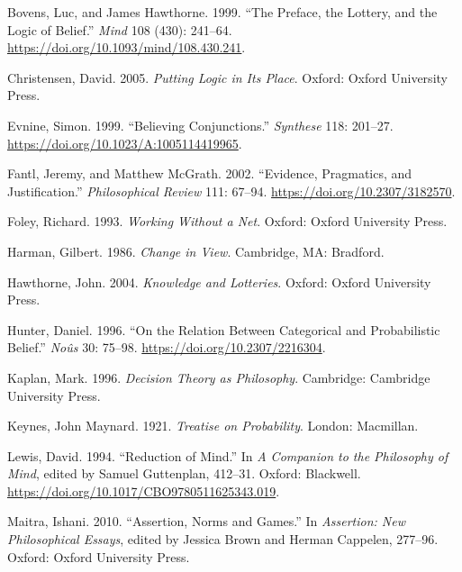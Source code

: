 \documentclass[
  11pt,
  letterpaper,
  DIV=11,
  numbers=noendperiod,
  oneside]{scrartcl}
\newlength{\cslhangindent}
\newenvironment{CSLReferences}[2] %
 {\begin{list}{}{%
  \setlength{\itemindent}{0pt}
  \setlength{\leftmargin}{0pt}
  \setlength{\parsep}{0pt}
  \ifodd #1
   \setlength{\leftmargin}{\cslhangindent}
   \setlength{\itemindent}{-1\cslhangindent}
  \fi
  \setlength{\itemsep}{#2\baselineskip}}}
 {\end{list}}
\begin{document}
\label{refs}
\begin{CSLReferences}{1}{0}
Bovens, Luc, and James Hawthorne. 1999. {``The Preface, the Lottery, and
the Logic of Belief.''} \emph{Mind} 108 (430): 241--64.
\url{https://doi.org/10.1093/mind/108.430.241}.

Christensen, David. 2005. \emph{Putting Logic in Its Place}. Oxford:
Oxford University Press.

Evnine, Simon. 1999. {``Believing Conjunctions.''} \emph{Synthese} 118:
201--27. \url{https://doi.org/10.1023/A:1005114419965}.

Fantl, Jeremy, and Matthew McGrath. 2002. {``Evidence, Pragmatics, and
Justification.''} \emph{Philosophical Review} 111: 67--94.
\url{https://doi.org/10.2307/3182570}.

Foley, Richard. 1993. \emph{Working Without a Net}. Oxford: Oxford
University Press.

Harman, Gilbert. 1986. \emph{Change in View}. Cambridge, MA: Bradford.

Hawthorne, John. 2004. \emph{Knowledge and Lotteries}. Oxford: Oxford
University Press.

Hunter, Daniel. 1996. {``On the Relation Between Categorical and
Probabilistic Belief.''} \emph{No{û}s} 30: 75--98.
\url{https://doi.org/10.2307/2216304}.

Kaplan, Mark. 1996. \emph{Decision Theory as Philosophy}. Cambridge:
Cambridge University Press.

Keynes, John Maynard. 1921. \emph{Treatise on Probability}. London:
Macmillan.

Lewis, David. 1994. {``Reduction of Mind.''} In \emph{A Companion to the
Philosophy of Mind}, edited by Samuel Guttenplan, 412--31. Oxford:
Blackwell. \url{https://doi.org/10.1017/CBO9780511625343.019}.

Maitra, Ishani. 2010. {``Assertion, Norms and Games.''} In
\emph{Assertion: New Philosophical Essays}, edited by Jessica Brown and
Herman Cappelen, 277--96. Oxford: Oxford University Press.


\end{CSLReferences}
\end{document}
